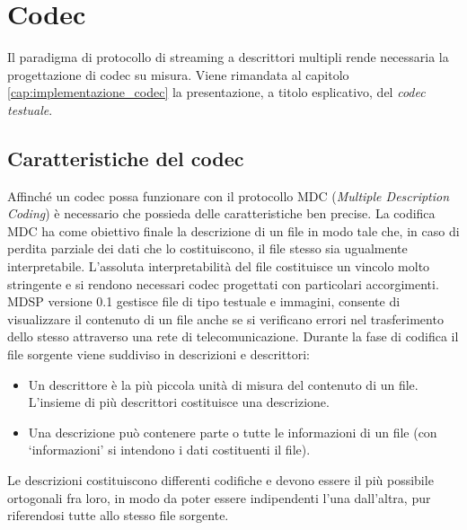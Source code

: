 % 







\section{Codec}
\label{cap:descrizione_codec}
Il paradigma di protocollo di streaming a descrittori multipli rende
necessaria la progettazione di codec su misura. Viene rimandata al capitolo
\ref{cap:implementazione_codec} la presentazione, a titolo esplicativo, del
\emph{codec testuale}.

\subsection{Caratteristiche del codec}
Affinché un codec possa funzionare con il protocollo MDC (\emph{Multiple
Description Coding}) è necessario che possieda delle caratteristiche ben
precise. La codifica MDC ha come obiettivo finale la descrizione di un file in
modo tale che, in caso di perdita parziale dei dati che lo costituiscono, il
file stesso sia ugualmente interpretabile. L'assoluta interpretabilità del
file costituisce un vincolo molto stringente e si rendono necessari codec
progettati con particolari accorgimenti. MDSP versione 0.1 gestisce file di
tipo testuale e immagini, consente di visualizzare il contenuto di un file anche
se si verificano errori nel trasferimento dello stesso attraverso una rete di telecomunicazione. Durante la fase di codifica il file sorgente viene suddiviso in descrizioni e descrittori:
\begin{itemize}
 \item Un descrittore è la più piccola unità di misura del contenuto di un
 file. L'insieme di più descrittori costituisce una descrizione.
 \item Una descrizione può contenere parte o tutte le informazioni di un file
 (con `informazioni' si intendono i dati costituenti il file).
\end{itemize}
Le descrizioni costituiscono differenti codifiche e devono essere il più possibile ortogonali fra loro, in modo da poter essere indipendenti l'una dall'altra, pur riferendosi tutte allo stesso file sorgente.


